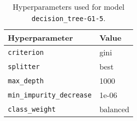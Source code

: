 \begin{table}[H]
\centering
\begin{tabularx}{0.48\textwidth}{|X|l|}
\hline
Hyperparameter & Value \\
\hline
\texttt{criterion} & gini \\
\texttt{splitter} & best \\
\texttt{max\_depth} & 1000 \\
\texttt{min\_impurity\_decrease} & 1e-06 \\
\texttt{class\_weight} & balanced \\
\hline
\end{tabularx}
\caption{Hyperparameters used for model \texttt{decision\_tree-G1-5}.}
\label{tab:hyperparameters_best_decision_tree}

\end{table}
